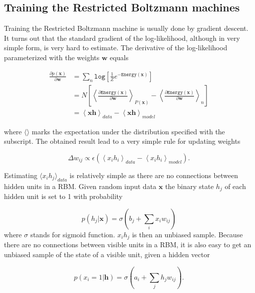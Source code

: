 \subsection{Training the Restricted Boltzmann machines}

Training the Restricted Boltzmann machine is usually done by gradient descent. It turns out that the standard gradient of the log-likelihood, although in very simple form, is very hard to estimate. The derivative of the log-likelihood parameterized with the weights $\mathbf{w}$ equals

\begin{align}
		\frac{\partial p(\mathbf{x})}{\partial \mathbf{w}} & = \sum_n \mathtt{log} \left [ \frac{1}{Z} e ^{-\mathtt{Energy}(\mathbf{x})}  \right ] \\
		& = N \left [ \left \langle \frac{\partial \mathtt{Energy}(\mathbf{x})}{\partial \mathbf{w}}  \right \rangle_{P(\mathbf{x})} - \left \langle \frac{\partial \mathtt{Energy}(\mathbf{x})}{\partial \mathbf{w}} \right \rangle_n  \right ] \\
		& = \left \langle \mathbf{x}\mathbf{h} \right \rangle_{data} - \left \langle \mathbf{x}\mathbf{h} \right \rangle_{model}
\end{align}

where $\langle \rangle$ marks the expectation under the distribution specified with the subscript. The obtained result lead to a very simple rule for updating weights

\begin{equation}
	\Delta w_{ij} \propto \epsilon \left (  \left \langle x_ih_i   \right \rangle_{data} - \left \langle x_ih_i   \right \rangle_{model}   \right ).
\end{equation}

Estimating $ \langle x_ih_j \rangle_{data}$ is relatively simple as there are no connections between hidden units in a RBM. Given random input data $\mathbf{x}$ the binary state $h_j$ of each hidden unit is set to 1 with probability

\begin{equation}
	p(h_j | \mathbf{x}) = \sigma \left ( b_j + \sum_i x_iw_{ij} \right )
	\label{eq:CDhid}
\end{equation}
where $\sigma$ stands for sigmoid function. $x_ih_j$ is then an unbiased sample. Because there are no connections between visible units in a RBM, it is also easy to get an unbiased sample of the state of a visible unit, given a hidden vector

\begin{equation}
	p(x_i=1 | \mathbf{h}) = \sigma \left ( a_i + \sum_jh_jw_{ij} \right ).
	\label{eq:CDvis}
\end{equation}

